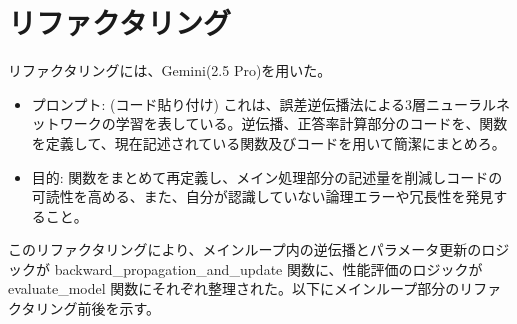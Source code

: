 \documentclass[11px,a4,dvipdfmx]{jsarticle}
\begin{document}
\section{リファクタリング}
リファクタリングには、Gemini(2.5 Pro)を用いた。
\begin{itemize}
    \item プロンプト: (コード貼り付け) これは、誤差逆伝播法による3層ニューラルネットワークの学習を表している。逆伝播、正答率計算部分のコードを、関数を定義して、現在記述されている関数及びコードを用いて簡潔にまとめろ。
    \item 目的: 関数をまとめて再定義し、メイン処理部分の記述量を削減しコードの可読性を高める、また、自分が認識していない論理エラーや冗長性を発見すること。
\end{itemize}
このリファクタリングにより、メインループ内の逆伝播とパラメータ更新のロジックが backward\_propagation\_and\_update 関数に、性能評価のロジックが evaluate\_model 関数にそれぞれ整理された。以下にメインループ部分のリファクタリング前後を示す。
\end{document}
